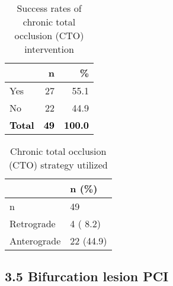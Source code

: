 \documentclass[
]{article}
\begin{document}
\begin{longtable}[t]{lrr}
\caption{\label{tab:table 36}Success rates of chronic total occlusion (CTO) intervention}\\
\toprule
 & n & \%\\
\midrule
Yes & 27 & 55.1\\
No & 22 & 44.9\\
\textcolor{black}{\textbf{Total}} & \textcolor{black}{\textbf{49}} & \textcolor{black}{\textbf{100.0}}\\
\bottomrule
\end{longtable}

\begin{longtable}[t]{ll}
\caption{\label{tab:table 37}Chronic total occlusion (CTO) strategy utilized}\\
\toprule
 & n (\%)\\
\midrule
n & 49\\
Retrograde & 4 ( 8.2)\\
Anterograde & 22 (44.9)\\
\bottomrule
\end{longtable}
\clearpage

\hypertarget{bifurcation-lesion-pci}{%
\subsection{3.5 Bifurcation lesion PCI}\label{bifurcation-lesion-pci}}
\end{document}
